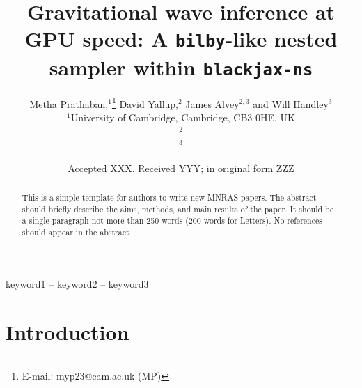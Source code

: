 \documentclass[fleqn,usenatbib]{mnras}
\title[Short title, max. 45 characters]{Gravitational wave inference at GPU speed: A \texttt{bilby}-like nested sampler within \texttt{blackjax-ns}}
\author[Metha Prathaban et al.]{
Metha Prathaban,$^{1}$\thanks{E-mail: myp23@cam.ac.uk (MP)}
David Yallup,$^{2}$
James Alvey$^{2,3}$
and Will Handley$^{3}$
\\
$^{1}$University of Cambridge, Cambridge, CB3 0HE, UK\\
$^{2}$\\
$^{3}$
}
\date{Accepted XXX. Received YYY; in original form ZZZ}
\begin{document}
\label{firstpage}
\pagerange{\pageref{firstpage}--\pageref{lastpage}}
\maketitle

\begin{abstract}
This is a simple template for authors to write new MNRAS papers.
The abstract should briefly describe the aims, methods, and main results of the paper.
It should be a single paragraph not more than 250 words (200 words for Letters).
No references should appear in the abstract.
\end{abstract}

\begin{keywords}
keyword1 -- keyword2 -- keyword3
\end{keywords}



\section{Introduction}






\end{document}
